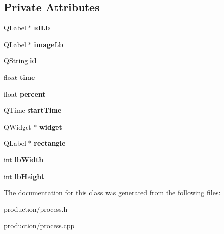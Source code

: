 \subsection*{Private Attributes}
\begin{DoxyCompactItemize}
\item 
\mbox{\label{classProcess_ac8e4aa2798ae16aedcae4283ad0e70d5}} 
Q\+Label $\ast$ {\bfseries id\+Lb}
\item 
\mbox{\label{classProcess_aec71703eda7f078df7040057a266897e}} 
Q\+Label $\ast$ {\bfseries image\+Lb}
\item 
\mbox{\label{classProcess_a5de834ffb6af8f42cb18215f9e80a49e}} 
Q\+String {\bfseries id}
\item 
\mbox{\label{classProcess_af8d80ed4b2adac62a9b62d8b5dd424ef}} 
float {\bfseries time}
\item 
\mbox{\label{classProcess_a233180a1cb4b17a4defbe26b23b512b2}} 
float {\bfseries percent}
\item 
\mbox{\label{classProcess_a2b96f008dfac491508cc71ff5acbdd33}} 
Q\+Time {\bfseries start\+Time}
\item 
\mbox{\label{classProcess_a1ce2017c4361aaf1de1db5f6f4e01cf3}} 
Q\+Widget $\ast$ {\bfseries widget}
\item 
\mbox{\label{classProcess_ab7fafff864b2f89a77f252a9029520a9}} 
Q\+Label $\ast$ {\bfseries rectangle}
\item 
\mbox{\label{classProcess_a667e5df463da098c5cc49fc6b1bf2069}} 
int {\bfseries lb\+Width}
\item 
\mbox{\label{classProcess_abc197f990b3be03e0ba8259e8089e0c6}} 
int {\bfseries lb\+Height}
\end{DoxyCompactItemize}


The documentation for this class was generated from the following files\+:\begin{DoxyCompactItemize}
\item 
production/process.\+h\item 
production/process.\+cpp\end{DoxyCompactItemize}
